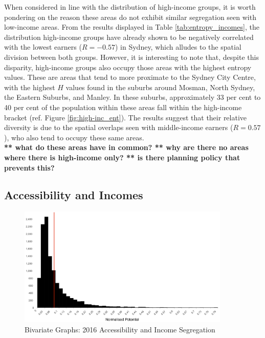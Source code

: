When considered in line with the distribution of high-income groups, it is worth pondering on the reason these areas do not exhibit similar segregation seen with low-income areas. From the results displayed in Table \ref{tab:entropy_incomes}, the distribution high-income groups have already shown to be negatively correlated with the lowest earners ($R=-0.57$) in Sydney, which alludes to the spatial division between both groups. However, it is interesting to note that, despite this disparity, high-income groups also occupy those areas with the highest entropy values. These are areas that tend to more proximate to the Sydney City Centre, with the highest $H$ values found in the suburbs around Mosman, North Sydney, the Eastern Suburbs, and Manley. In these suburbs, approximately 33 per cent to 40 per cent of the population within these areas fall within the high-income bracket (ref. Figure \ref{fig:high-inc_ent}). The results suggest that their relative diversity is due to the spatial overlaps seen with middle-income earners ($R=0.57$), who also tend to occupy these same areas.\\

\textbf{** what do these areas have in common? ** why are there no areas where there is high-income only? ** is there planning policy that prevents this?}\\


\subsection{Accessibility and Incomes}

\begin{figure}[!ht]
    \includegraphics[width=0.9\textwidth]{body/figures/accessibility_histogram.png}
    \caption{Bivariate Graphs: 2016 Accessibility and Income Segregation}
    \label{fig:access_hist}
\end{figure}

